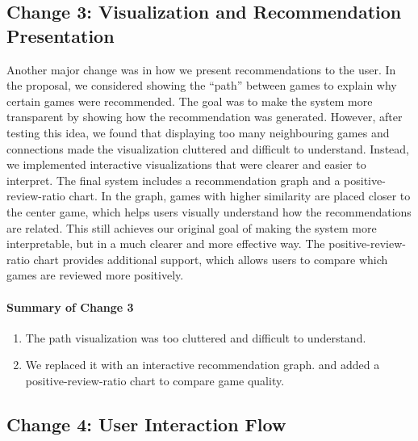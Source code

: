 \documentclass[fontsize=11pt]{article}
\begin{document}
\bigskip

\subsection*{Change 3: Visualization and Recommendation Presentation}

Another major change was in how we present recommendations to the user. In the proposal, we considered showing the ``path'' between games to explain why certain games were recommended. The goal was to make the system more transparent by showing how the recommendation was generated. However, after testing this idea, we found that displaying too many neighbouring games and connections made the visualization cluttered and difficult to understand. Instead, we implemented interactive visualizations that were clearer and easier to interpret. The final system includes a recommendation graph and a positive-review-ratio chart. In the graph, games with higher similarity are placed closer to the center game, which helps users visually understand how the recommendations are related. This still achieves our original goal of making the system more interpretable, but in a much clearer and more effective way. The positive-review-ratio chart provides additional support, which allows users to compare which games are reviewed more positively.

\paragraph{Summary of Change 3}
\begin{enumerate}
    \item The path visualization was too cluttered and difficult to understand.
    \item We replaced it with an interactive recommendation graph. and added a positive-review-ratio chart to compare game quality.
\end{enumerate}

\newpage

\subsection*{Change 4: User Interaction Flow}
\end{document}
